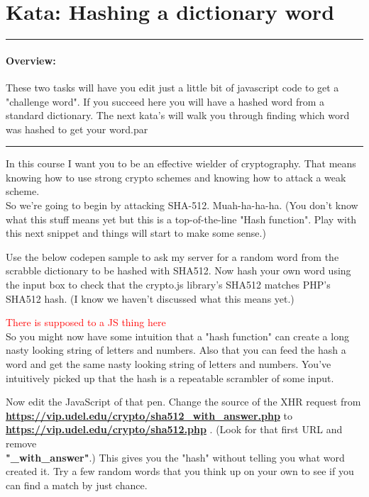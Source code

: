 \documentclass[12pt]{book}
\newenvironment{task}[1][Task:]{ %
    \medskip
    \begin{mdframed}[style=info]
        \noindent{\textbf{#1}}
}{
    \end{mdframed}
}
\newenvironment{overview}
  {\noindent\rule{\textwidth}{0.4pt}
  \paragraph{Overview:}
  }
  {\par
  \noindent\rule{\textwidth}{0.4pt}
  }
\begin{document}
\section{Kata: Hashing a dictionary word}

\begin{overview}
These two tasks will have you edit just a little bit of javascript code to get a "challenge word". If you succeed here you will have a hashed word from a standard dictionary. The next kata's will walk you through finding which word was hashed to get your word.par
\end{overview}

In this course I want you to be an effective wielder of cryptography. That means knowing how to use strong crypto schemes and knowing how to attack a weak scheme.\\

So we're going to begin by attacking SHA-512. Muah-ha-ha-ha. (You don't know what this stuff means yet but this is a top-of-the-line "Hash function". Play with this next snippet and things will start to make some sense.)

\begin{task}[CodePen 101 Task:]
Use the below codepen sample to ask my server for a random word from the scrabble dictionary to be hashed with SHA512. Now hash your own word using the input box to check that the crypto.js library's SHA512 matches PHP's SHA512 hash. (I know we haven't discussed what this means yet.)
\end{task}

\textcolor{red}{There is supposed to a JS thing here}\\

So you might now have some intuition that a "hash function" can create a long nasty looking string of letters and numbers. Also that you can feed the hash a word and get the same nasty looking string of letters and numbers. You've intuitively picked up that the hash is a repeatable scrambler of some input.

\begin{task}[CodePen 102 Task:]
Now edit the JavaScript of that pen. Change the source of the XHR request from \href{https://vip.udel.edu/crypto/sha512_with_answer.php}{\textbf{https://vip.udel.edu/crypto/sha512\_with\_answer.php}} to\\ \href{https://vip.udel.edu/crypto/sha512.php}{\textbf{https://vip.udel.edu/crypto/sha512.php}} . (Look for that first URL and remove\\ \textbf{"\_with\_answer"}.) This gives you the "hash" without telling you what word created it. Try a few random words that you think up on your own to see if you can find a match by just chance.
 \end{task}
\end{document}
